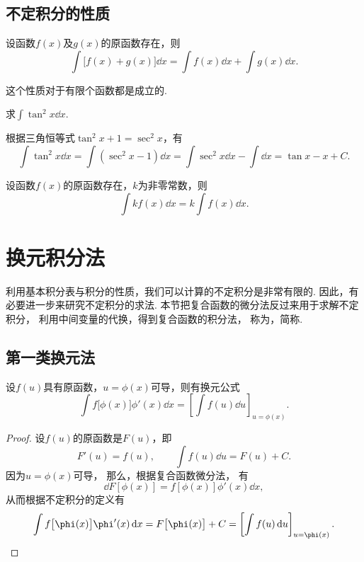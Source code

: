\subsection{不定积分的性质}
\begin{property}
设函数\(f(x)\)及\(g(x)\)的原函数存在，则\[
\int \bigl[f(x) + g(x)\bigr] \dd{x} = \int f(x) \dd{x} + \int g(x) \dd{x}.
\]
\end{property}
这个性质对于有限个函数都是成立的.

\begin{example}
求\(\int \tan^2 x \dd{x}\).
\begin{solution}
根据三角恒等式\(\tan^2 x + 1 = \sec^2 x\)，有\[
\int \tan^2 x \dd{x}
= \int (\sec^2 x - 1) \dd{x}
= \int \sec^2 x \dd{x} - \int \dd{x}
= \tan x - x + C.
\]
\end{solution}
\end{example}

\begin{property}
设函数\(f(x)\)的原函数存在，\(k\)为非零常数，则\[
\int k f(x) \dd{x} = k \int f(x) \dd{x}.
\]
\end{property}

\section{换元积分法}
利用基本积分表与积分的性质，我们可以计算的不定积分是非常有限的.
因此，有必要进一步来研究不定积分的求法.
本节把复合函数的微分法反过来用于求解不定积分，
利用中间变量的代换，得到复合函数的积分法，
称为，简称.

\subsection{第一类换元法}
\begin{theorem}
设\(f(u)\)具有原函数，\(u=\phi(x)\)可导，则有换元公式\[
	\int f\bigl[\phi(x)\bigr] \phi'(x) \dd{x}
	= \left[ \int f(u) \dd{u} \right]_{u=\phi(x)}.
\]
\begin{proof}
设\(f(u)\)的原函数是\(F(u)\)，即\[
	F'(u) = f(u),
	\qquad
	\int f(u) \dd{u} = F(u) + C.
\]
因为\(u = \phi(x)\)可导，
那么，根据复合函数微分法，
有\[
	\dd{F\left[\phi(x)\right]} = f\left[\phi(x)\right] \phi'(x) \dd{x},
\]
从而根据不定积分的定义有\[
	\int f\bigl[\phi(x)\bigr] \phi'(x) \dd{x}
	= F\bigl[\phi(x)\bigr] + C
	= \left[ \int f(u) \dd{u} \right]_{u=\phi(x)}.
	\qedhere
\]
\end{proof}
\end{theorem}


